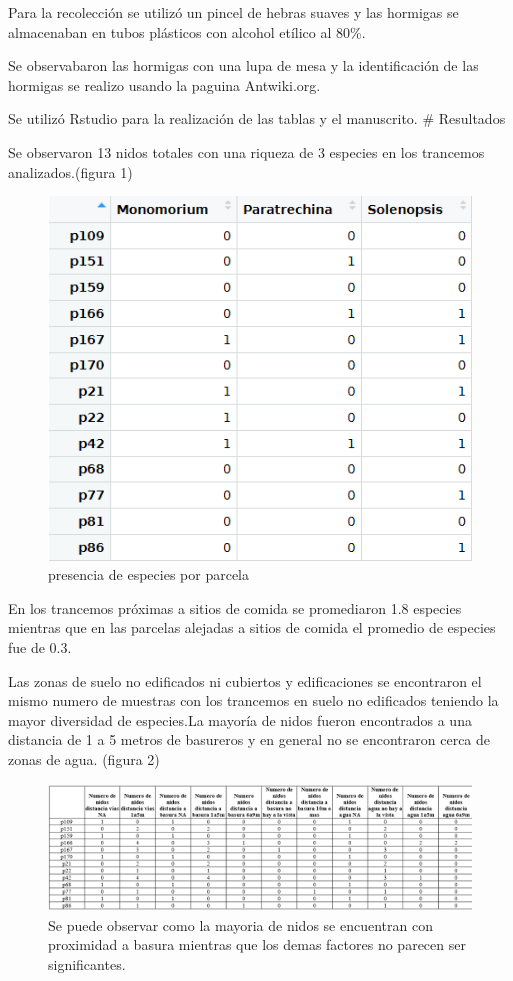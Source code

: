 \documentclass[11pt,]{article}
\begin{document}
Para la recolección se utilizó un pincel de hebras suaves y las hormigas
se almacenaban en tubos plásticos con alcohol etílico al 80\%.

Se observabaron las hormigas con una lupa de mesa y la identificación de
las hormigas se realizo usando la paguina Antwiki.org.

Se utilizó Rstudio para la realización de las tablas y el manuscrito. \#
Resultados

Se observaron 13 nidos totales con una riqueza de 3 especies en los
trancemos analizados.(figura 1)

\begin{figure}
\centering
\includegraphics{img/presencia de especies.png}
\caption{presencia de especies por parcela}
\end{figure}

En los trancemos próximas a sitios de comida se promediaron 1.8 especies
mientras que en las parcelas alejadas a sitios de comida el promedio de
especies fue de 0.3.

Las zonas de suelo no edificados ni cubiertos y edificaciones se
encontraron el mismo numero de muestras con los trancemos en suelo no
edificados teniendo la mayor diversidad de especies.La mayoría de nidos
fueron encontrados a una distancia de 1 a 5 metros de basureros y en
general no se encontraron cerca de zonas de agua. (figura 2)

\begin{figure}
\centering
\includegraphics{img/distancias.png}
\caption{Se puede observar como la mayoria de nidos se encuentran con
proximidad a basura mientras que los demas factores no parecen ser
significantes.}
\end{figure}
\end{document}
